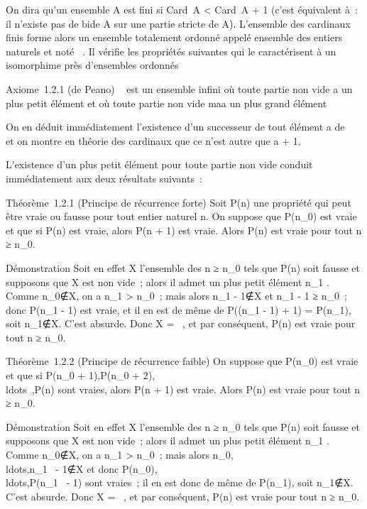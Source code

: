 On dira qu'un ensemble A est fini si Card~A
\textless{} Card~A + 1 (c'est équivalent à~: il
n'existe pas de bi\jmathection de A sur une partie stricte de A). L'ensemble
des cardinaux finis forme alors un ensemble totalement ordonné appelé
ensemble des entiers naturels et noté ~. Il vérifie les propriétés
suivantes qui le caractérisent à un isomorphime près d'ensembles
ordonnés

Axiome~1.2.1 (de Peano) ~ est un ensemble infini où toute partie non
vide a un plus petit élément et où toute partie non vide ma a un
plus grand élément

On en déduit immédiatement l'existence d'un successeur de tout élément a
de ~ et on montre en théorie des cardinaux que ce n'est autre que a + 1.

L'existence d'un plus petit élément pour toute partie non vide conduit
immédiatement aux deux résultats suivants~:

Théorème~1.2.1 (Principe de récurrence forte) Soit P(n) une propriété
qui peut être vraie ou fausse pour tout entier naturel n. On suppose que
P(n\_0) est vraie et que si P(n) est vraie, alors P(n + 1) est
vraie. Alors P(n) est vraie pour tout n ≥ n\_0.

Démonstration Soit en effet X l'ensemble des n ≥ n\_0 tels que
P(n) soit fausse et supposons que X est non vide~; alors il admet un
plus petit élément n\_1 \inX. Comme
n\_0∉X, on a n\_1
\textgreater{} n\_0~; mais alors n\_1 -
1∉X et n\_1 - 1 ≥ n\_0~; donc
P(n\_1 - 1) est vraie, et il en est de même de P((n\_1 -
1) + 1) = P(n\_1), soit
n\_1∉X. C'est absurde. Donc X = \varnothing~, et
par conséquent, P(n) est vraie pour tout n ≥ n\_0.

Théorème~1.2.2 (Principe de récurrence faible) On suppose que
P(n\_0) est vraie et que si P(n\_0 + 1),P(n\_0 +
2),\\ldots~,P(n)
sont vraies, alors P(n + 1) est vraie. Alors P(n) est vraie pour tout n
≥ n\_0.

Démonstration Soit en effet X l'ensemble des n ≥ n\_0 tels que
P(n) soit fausse et supposons que X est non vide~; alors il admet un
plus petit élément n\_1 \inX. Comme
n\_0∉X, on a n\_1
\textgreater{} n\_0~; mais alors
n\_0,\\ldots,n\_1~
- 1∉X et donc
P(n\_0),\\ldots,P(n\_1~
- 1) sont vraies~; il en est donc de même de P(n\_1), soit
n\_1∉X. C'est absurde. Donc X = \varnothing~, et
par conséquent, P(n) est vraie pour tout n ≥ n\_0.
